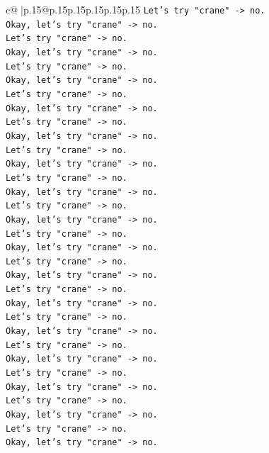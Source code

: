 \documentclass{article}
\begin{document}
{\begin{supertabular}{c@{$\;$}|p{.15\linewidth}@{}p{.15\linewidth}p{.15\linewidth}p{.15\linewidth}p{.15\linewidth}p{.15\linewidth}}
{{{\texttt{Let's try "crane" {-}> no.} \\
\texttt{Okay, let's try "crane" {-}> no.} \\
\texttt{Let's try "crane" {-}> no.} \\
\texttt{Okay, let's try "crane" {-}> no.} \\
\texttt{Let's try "crane" {-}> no.} \\
\texttt{Okay, let's try "crane" {-}> no.} \\
\texttt{Let's try "crane" {-}> no.} \\
\texttt{Okay, let's try "crane" {-}> no.} \\
\texttt{Let's try "crane" {-}> no.} \\
\texttt{Okay, let's try "crane" {-}> no.} \\
\texttt{Let's try "crane" {-}> no.} \\
\texttt{Okay, let's try "crane" {-}> no.} \\
\texttt{Let's try "crane" {-}> no.} \\
\texttt{Okay, let's try "crane" {-}> no.} \\
\texttt{Let's try "crane" {-}> no.} \\
\texttt{Okay, let's try "crane" {-}> no.} \\
\texttt{Let's try "crane" {-}> no.} \\
\texttt{Okay, let's try "crane" {-}> no.} \\
\texttt{Let's try "crane" {-}> no.} \\
\texttt{Okay, let's try "crane" {-}> no.} \\
\texttt{Let's try "crane" {-}> no.} \\
\texttt{Okay, let's try "crane" {-}> no.} \\
\texttt{Let's try "crane" {-}> no.} \\
\texttt{Okay, let's try "crane" {-}> no.} \\
\texttt{Let's try "crane" {-}> no.} \\
\texttt{Okay, let's try "crane" {-}> no.} \\
\texttt{Let's try "crane" {-}> no.} \\
\texttt{Okay, let's try "crane" {-}> no.} \\
\texttt{Let's try "crane" {-}> no.} \\
\texttt{Okay, let's try "crane" {-}> no.} \\
\texttt{Let's try "crane" {-}> no.} \\
\texttt{Okay, let's try "crane" {-}> no.} \\
}}}
\end{supertabular}}
\end{document}
